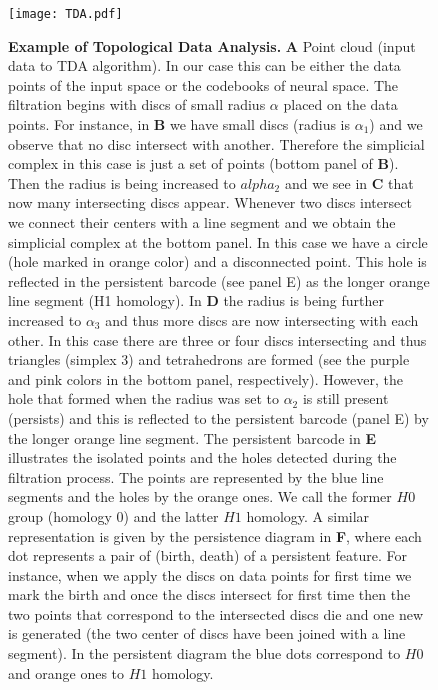 \begin{figure}[!htpb]
    \centering
    \texttt{[image: TDA.pdf]}
    \caption{\textbf{Example of Topological Data Analysis.}
      \textbf{A} Point cloud (input data to TDA algorithm). In our
      case this can be either the data points of the input space or
      the codebooks of neural space. The filtration begins with discs
      of small radius $\alpha$ placed on the data points. For
      instance, in \textbf{B} we have small discs (radius is
      $\alpha_1$) and we observe that no disc intersect with
      another. Therefore the simplicial complex in this case is just a
      set of points (bottom panel of \textbf{B}). Then the radius is
      being increased to $alpha_2$ and we see in \textbf{C} that now
      many intersecting discs appear. Whenever two discs intersect we
      connect their centers with a line segment and we obtain the
      simplicial complex at the bottom panel. In this case we have a
      circle (hole marked in orange color) and a disconnected point.
      This hole is reflected in the persistent barcode (see panel E)
      as the longer orange line segment (H1 homology).  In \textbf{D}
      the radius is being further increased to $\alpha_3$ and thus
      more discs are now intersecting with each other. In this case
      there are three or four discs intersecting and thus triangles
      (simplex $3$) and tetrahedrons are formed (see the purple and
      pink colors in the bottom panel, respectively). However, the
      hole that formed when the radius was set to $\alpha_2$ is still
      present (persists) and this is reflected to the persistent
      barcode (panel E) by the longer orange line segment.  The
      persistent barcode in \textbf{E} illustrates the isolated points
      and the holes detected during the filtration process. The points
      are represented by the blue line segments and the holes by the
      orange ones. We call the former $H0$ group (homology $0$) and
      the latter $H1$ homology. A similar representation is given by
      the persistence diagram in \textbf{F}, where each dot represents
      a pair of (birth, death) of a persistent feature. For instance,
      when we apply the discs on data points for first time we mark
      the birth and once the discs intersect for first time then the
      two points that correspond to the intersected discs die and one
      new is generated (the two center of discs have been joined with
      a line segment). In the persistent diagram the blue dots
      correspond to $H0$ and orange ones to $H1$ homology.}
    \label{fig:tda_example}
\end{figure}




